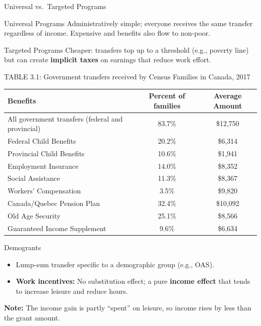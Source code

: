\documentclass[aspectratio=169]{beamer}
\begin{document}
\begin{frame}{Universal vs.\ Targeted Programs}
\transfade
\begin{block}{Universal Programs}
Administratively simple; everyone receives the same transfer regardless of income. Expensive and benefits also flow to non-poor.
\end{block}
\begin{block}{Targeted Programs}
Cheaper: transfers top up to a threshold (e.g., poverty line) but can create \textbf{implicit taxes} on earnings that reduce work effort.
\end{block}
\end{frame}

\begin{frame}{TABLE 3.1: Government transfers received by Census Families in Canada, 2017}
\transfade
\small
\begin{tabular}{lcc}
\toprule
\textbf{Benefits} & \textbf{Percent of families} & \textbf{Average Amount} \\
\midrule
All government transfers (federal and provincial) & 83.7\% & \$12,750 \\
Federal Child Benefits & 20.2\% & \$6,314 \\
Provincial Child Benefits & 10.6\% & \$1,941 \\
Employment Insurance & 14.0\% & \$8,352 \\
Social Assistance & 11.3\% & \$8,367 \\
Workers’ Compensation & 3.5\% & \$9,820 \\
Canada/Quebec Pension Plan & 32.4\% & \$10,092 \\
Old Age Security & 25.1\% & \$8,566 \\
Guaranteed Income Supplement & 9.6\% & \$6,634 \\
\bottomrule
\end{tabular}
\end{frame}


\begin{frame}{Demogrants}
\transfade
\begin{itemize}
  \item Lump-sum transfer specific to a demographic group (e.g., OAS).
  \item \textbf{Work incentives:} No substitution effect; a pure \textbf{income effect} that tends to increase leisure and reduce hours.
  \end{itemize}
  \vspace{0.5cm}
\textbf{Note:} The income gain is partly “spent” on leisure, so income rises by less than the grant amount.

\end{frame}
\end{document}
